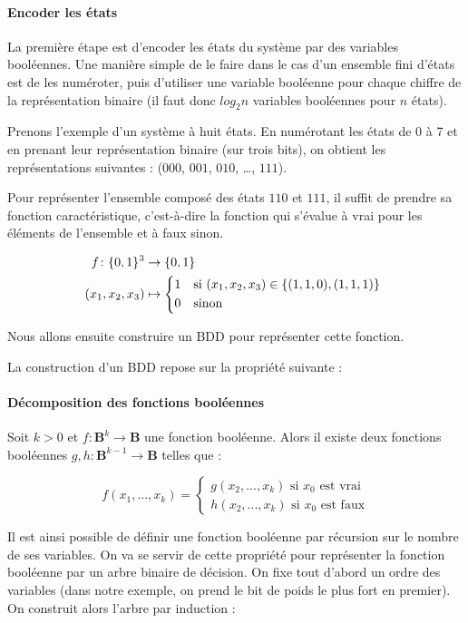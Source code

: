 \paragraph{Encoder les états}
La première étape est d'encoder les états du système par des variables
booléennes. Une manière simple de le faire dans le cas d'un ensemble fini
d'états est de les numéroter, puis d'utiliser une variable booléenne pour chaque
chiffre de la représentation binaire (il faut donc \(log_2 n\) variables
booléennes pour \(n\) états).

Prenons l'exemple d'un système à huit états. En numérotant les états de 0 à 7 et
en prenant leur représentation binaire (sur trois bits), on obtient les
représentations suivantes : (\(000\), \(001\), \(010\), \dots, \(111\)).


Pour représenter l'ensemble composé des états \(110\) et \(111\), il suffit
de prendre sa fonction caractéristique, c'est-à-dire la fonction qui s'évalue à
vrai pour les éléments de l'ensemble et à faux sinon.

\begin{align}
  f \colon \{0, 1\}^3 & \to \{0, 1\} \\
  (x_1, x_2, x_3) & \mapsto
  \begin{cases*}
    1 & si \((x_1, x_2, x_3) \in \{(1,1,0), (1,1,1)\}\) \\
    0 & sinon
  \end{cases*}
\end{align}

Nous allons ensuite construire un \ac{BDD} pour représenter cette fonction.

La construction d'un \ac{BDD} repose sur la propriété suivante :

\paragraph{Décomposition des fonctions booléennes}
Soit \(k > 0\) et \(f: \mathbf{B}^k \to \mathbf{B}\) une
fonction booléenne. Alors il existe deux fonctions booléennes
\(g, h : \mathbf{B}^{k-1} \to \mathbf{B}\) telles que :

\[
f(x_1, ..., x_k) =
\begin{cases*}
  g(x_2, ..., x_k) \text{ si $x_0$ est vrai}\\
  h(x_2, ..., x_k) \text{ si $x_0$ est faux}
\end{cases*}
\]

Il est ainsi possible de définir une fonction booléenne par récursion
sur le nombre de ses variables. On va se servir de cette propriété pour
représenter la fonction booléenne par un arbre binaire de décision. On
fixe tout d'abord un ordre des variables (dans notre exemple, on prend
le bit de poids le plus fort en premier). On construit alors l'arbre
par induction :

